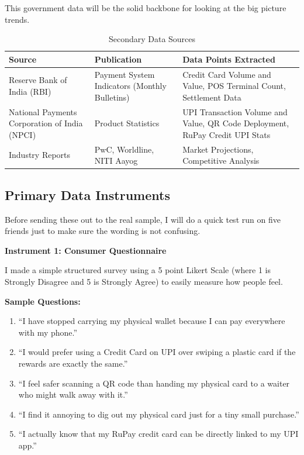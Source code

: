 This government data will be the solid backbone for looking at the big picture trends.

\begin{table}[htbp]
    \centering
    \caption{Secondary Data Sources}
    \vspace{0.3cm}
    \begin{tabular}{|p{3cm}|p{5cm}|p{5cm}|}
    \hline
    \textbf{Source} & \textbf{Publication} & \textbf{Data Points Extracted} \\
    \hline
    Reserve Bank of India (RBI) & Payment System Indicators (Monthly Bulletins) & Credit Card Volume and Value, POS Terminal Count, Settlement Data \\
    \hline
    National Payments Corporation of India (NPCI) & Product Statistics & UPI Transaction Volume and Value, QR Code Deployment, RuPay Credit UPI Stats \\
    \hline
    Industry Reports & PwC, Worldline, NITI Aayog & Market Projections, Competitive Analysis \\
    \hline
    \end{tabular}
    \label{tab:secondary_sources}
\end{table}

\subsection{Primary Data Instruments}

Before sending these out to the real sample, I will do a quick test run on five friends just to make sure the wording is not confusing.

\textbf{Instrument 1: Consumer Questionnaire}

I made a simple structured survey using a 5 point Likert Scale (where 1 is Strongly Disagree and 5 is Strongly Agree) to easily measure how people feel.

\textbf{Sample Questions:}
\begin{enumerate}
    \item ``I have stopped carrying my physical wallet because I can pay everywhere with my phone.''
    \item ``I would prefer using a Credit Card on UPI over swiping a plastic card if the rewards are exactly the same.''
    \item ``I feel safer scanning a QR code than handing my physical card to a waiter who might walk away with it.''
    \item ``I find it annoying to dig out my physical card just for a tiny small purchase.''
    \item ``I actually know that my RuPay credit card can be directly linked to my UPI app.''
\end{enumerate}

